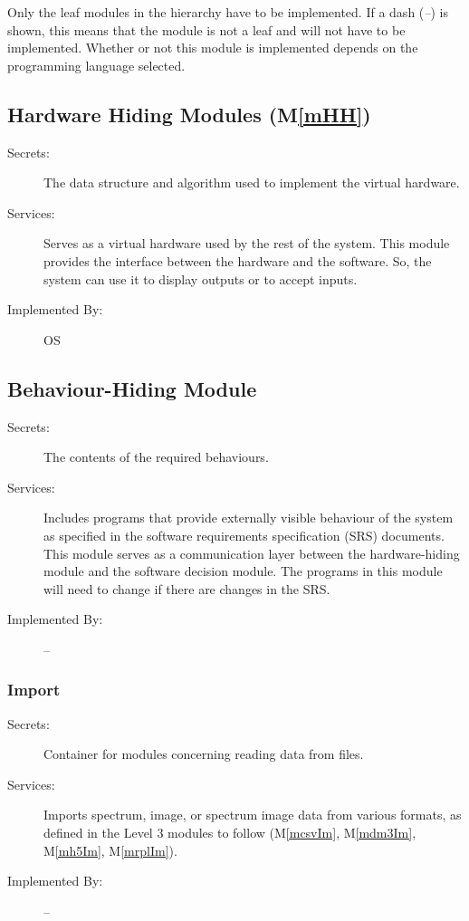 \documentclass[12pt, titlepage]{article}
\newcommand{\mref}[1]{M\ref{#1}}
\begin{document}
Only the leaf modules in the
hierarchy have to be implemented. If a dash (\emph{--}) is shown, this means
that the module is not a leaf and will not have to be implemented. Whether or
not this module is implemented depends on the programming language
selected.

\subsection{Hardware Hiding Modules (\mref{mHH})}

\begin{description}
\item[Secrets:]The data structure and algorithm used to implement the virtual
  hardware.
\item[Services:]Serves as a virtual hardware used by the rest of the
  system. This module provides the interface between the hardware and the
  software. So, the system can use it to display outputs or to accept inputs.
\item[Implemented By:] OS
\end{description}

\subsection{Behaviour-Hiding Module}

\begin{description}
\item[Secrets:]The contents of the required behaviours.
\item[Services:]Includes programs that provide externally visible behaviour of
  the system as specified in the software requirements specification (SRS)
  documents. This module serves as a communication layer between the
  hardware-hiding module and the software decision module. The programs in this
  module will need to change if there are changes in the SRS.
\item[Implemented By:] --
\end{description}

\subsubsection{Import}
\begin{description}
	\item[Secrets:]Container for modules concerning reading data from files.
	\item[Services:]Imports spectrum, image, or spectrum image data from various
formats, as defined in the Level 3 modules to follow (\mref{mcsvIm},
\mref{mdm3Im}, \mref{mh5Im}, \mref{mrplIm}). 
	\item[Implemented By:] --
\end{description}
\end{document}

